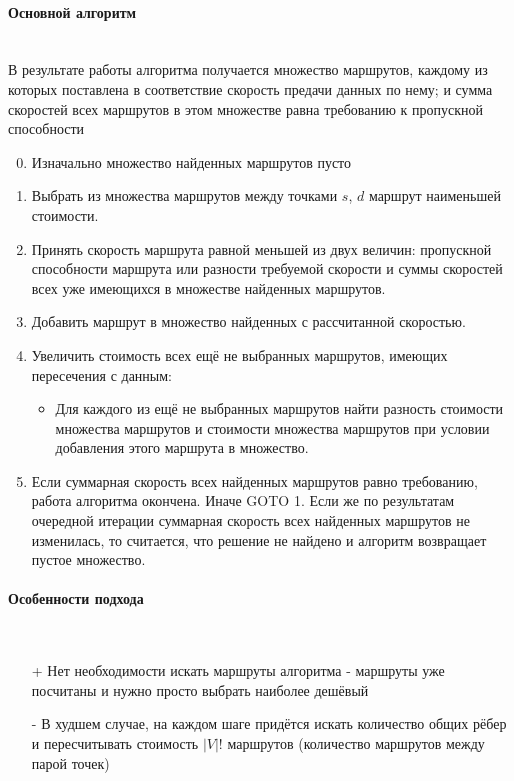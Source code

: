 \documentclass[a4paper]{article}
\begin{document}
\paragraph{Основной алгоритм}\mbox{}\\
В результате работы алгоритма получается множество маршрутов, каждому из которых поставлена в соответствие скорость предачи данных по нему; и сумма скоростей всех маршрутов в этом множестве равна требованию к пропускной способности
\begin{enumerate}
\setcounter{enumi}{-1}
\item Изначально множество найденных маршрутов пусто
\item Выбрать из множества маршрутов между точками $s$, $d$ маршрут наименьшей стоимости.
\item Принять скорость маршрута равной меньшей из двух величин: пропускной способности маршрута или разности требуемой скорости и суммы скоростей всех уже имеющихся в множестве найденных маршрутов.
\item Добавить маршрут в множество найденных с рассчитанной скоростью. 
\item Увеличить стоимость всех ещё не выбранных маршрутов, имеющих пересечения с данным:
\begin{itemize}
\item Для каждого из ещё не выбранных маршрутов найти разность стоимости множества маршрутов и стоимости множества маршрутов при условии добавления этого маршрута в множество.
\end{itemize}
\item Если суммарная скорость всех найденных маршрутов равно требованию, работа алгоритма окончена. Иначе  GOTO 1. Если же по результатам очередной итерации суммарная скорость всех найденных маршрутов не изменилась, то считается, что решение не найдено и алгоритм возвращает пустое множество.
\end{enumerate}
\paragraph{Особенности подхода}\mbox{}\\
\begin{itemize}
\item[+] Нет необходимости искать маршруты алгоритма - маршруты уже посчитаны и нужно просто выбрать наиболее дешёвый
\item[-] В худшем случае, на каждом шаге придётся искать количество общих рёбер и пересчитывать стоимость $|V|!$ маршрутов (количество маршрутов между парой точек)
\end{itemize}
\end{document}
